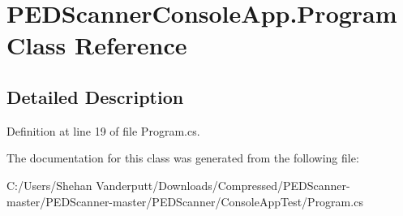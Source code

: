 \hypertarget{class_p_e_d_scanner_console_app_1_1_program}{}\section{P\+E\+D\+Scanner\+Console\+App.\+Program Class Reference}
\label{class_p_e_d_scanner_console_app_1_1_program}


\subsection{Detailed Description}


Definition at line 19 of file Program.\+cs.



The documentation for this class was generated from the following file\+:\begin{DoxyCompactItemize}
\item 
C\+:/\+Users/\+Shehan Vanderputt/\+Downloads/\+Compressed/\+P\+E\+D\+Scanner-\/master/\+P\+E\+D\+Scanner-\/master/\+P\+E\+D\+Scanner/\+Console\+App\+Test/Program.\+cs\end{DoxyCompactItemize}
